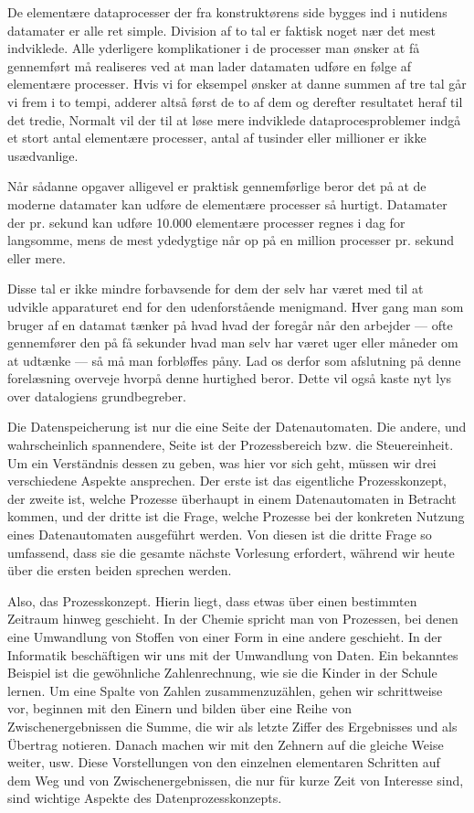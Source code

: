 {De elementære dataprocesser der fra konstruktørens side bygges ind i nutidens datamater er alle ret simple. Division af to tal er faktisk noget nær det mest indviklede. Alle yderligere komplikationer i de processer man ønsker at få gennemført må realiseres ved at man lader datamaten udføre en følge af elementære processer. Hvis vi for eksempel ønsker at danne summen af tre tal går vi frem i to tempi, adderer altså først de to af dem og derefter resultatet heraf til det tredie, Normalt vil der til at løse mere indviklede dataprocesproblemer indgå et stort antal elementære processer, antal af tusinder eller millioner er ikke usædvanlige. 

Når sådanne opgaver alligevel er praktisk gennemførlige beror det på at de moderne datamater kan udføre de elementære processer så hurtigt. Datamater der pr. sekund kan udføre 10.000 elementære processer regnes i dag for langsomme, mens de mest ydedygtige når op på en million processer pr. sekund eller mere. 

Disse tal er ikke mindre forbavsende for dem der selv har været med til at udvikle apparaturet end for den udenforstående menigmand. Hver gang man som bruger af en datamat tænker på hvad hvad der foregår når den arbejder — ofte gennemfører den på få sekunder hvad man selv har været uger eller måneder om at udtænke — så må man forbløffes påny. Lad os derfor som afslutning på denne forelæsning overveje hvorpå denne hurtighed beror. Dette vil også kaste nyt lys over datalogiens grundbegreber. 
}{
Die Datenspeicherung ist nur die eine Seite der Datenautomaten. Die andere, und wahrscheinlich spannendere, Seite ist der Prozessbereich bzw. die Steuereinheit. Um ein Verständnis dessen zu geben, was hier vor sich geht, müssen wir drei verschiedene Aspekte ansprechen. Der erste ist das eigentliche Prozesskonzept, der zweite ist, welche Prozesse überhaupt in einem Datenautomaten in Betracht kommen, und der dritte ist die Frage, welche Prozesse bei der konkreten Nutzung eines Datenautomaten ausgeführt werden. Von diesen ist die dritte Frage so umfassend, dass sie die gesamte nächste Vorlesung erfordert, während wir heute über die ersten beiden sprechen werden.

Also, das Prozesskonzept. Hierin liegt, dass etwas über einen bestimmten Zeitraum hinweg geschieht. In der Chemie spricht man von Prozessen, bei denen eine Umwandlung von Stoffen von einer Form in eine andere geschieht. In der Informatik beschäftigen wir uns mit der Umwandlung von Daten. Ein bekanntes Beispiel ist die gewöhnliche Zahlenrechnung, wie sie die Kinder in der Schule lernen. Um eine Spalte von Zahlen zusammenzuzählen, gehen wir schrittweise vor, beginnen mit den Einern und bilden über eine Reihe von Zwischenergebnissen die Summe, die wir als letzte Ziffer des Ergebnisses und als Übertrag notieren. Danach machen wir mit den Zehnern auf die gleiche Weise weiter, usw. Diese Vorstellungen von den einzelnen elementaren Schritten auf dem Weg und von Zwischenergebnissen, die nur für kurze Zeit von Interesse sind, sind wichtige Aspekte des Datenprozesskonzepts.

}
